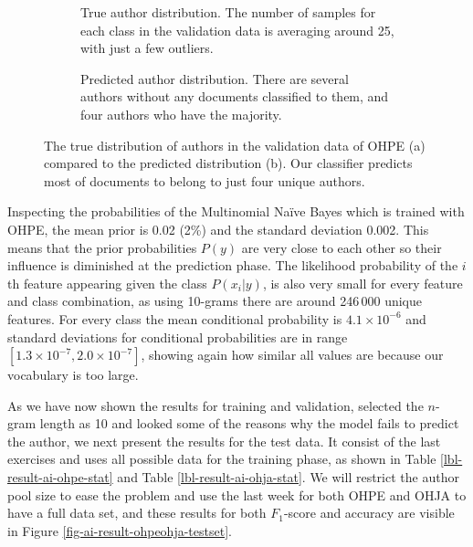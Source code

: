 \newpage

\begin{figure}[ht] 
  \centering
  \begin{subfigure}[b]{\linewidth}
    \centering
    \setlength\figureheight{5.5cm}
    \setlength\figurewidth{\textwidth}
    
    \caption{True author distribution. The number of samples for each class in the validation data is averaging around 25, with just a few outliers.}
    \vspace{4ex}
  \end{subfigure}
  \begin{subfigure}[b]{\linewidth}
    \centering
    \setlength\figureheight{5.5cm}
    \setlength\figurewidth{\textwidth}
    
    \caption{Predicted author distribution. There are several authors without any documents classified to them, and four authors who have the majority.}
  \end{subfigure}
  \caption{The true distribution of authors in the validation data of OHPE (a) compared to the predicted distribution (b). Our classifier predicts most of documents to belong to just four unique authors.}
  \label{fig-ai-result-author-distr}
\end{figure}



Inspecting the probabilities of the Multinomial Naïve Bayes which is trained with OHPE, the mean prior is 0.02 (2\%) and the standard deviation 0.002. This means that the prior probabilities $P(y)$ are very close to each other so their influence is diminished at the prediction phase. The likelihood \ie probability of the $i$th feature appearing given the class $P(x_i | y)$, is also very small for every feature and class combination, as using 10-grams there are around 246\,000 unique features. For every class the mean conditional probability is $4.1 \times 10^{-6}$ and standard deviations for conditional probabilities are in range $[1.3 \times 10^{-7}, 2.0 \times 10^{-7}]$, showing again how similar all values are because our vocabulary is too large. 

As we have now shown the results for training and validation, selected the $n$-gram length as 10 and looked some of the reasons why the model fails to predict the author, we next present the results for the test data. It consist of the last exercises and uses all possible data for the training phase, as shown in Table \ref{lbl-result-ai-ohpe-stat} and Table \ref{lbl-result-ai-ohja-stat}. We will restrict the author pool size to ease the problem and use the last week for both OHPE and OHJA to have a full data set, and these results for both $F_1$-score and accuracy are visible in Figure \ref{fig-ai-result-ohpeohja-testset}. 


